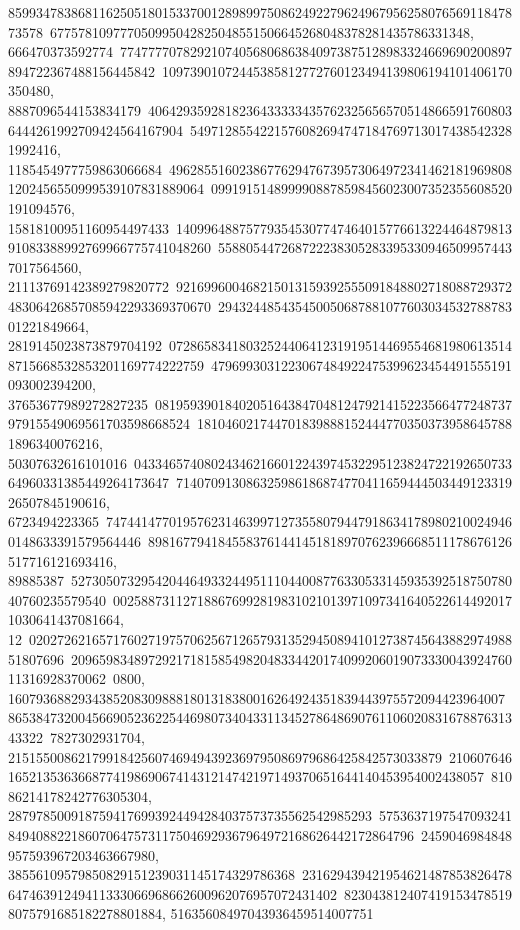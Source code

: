 {{{85993478386811625051801533700128989975086249227962496795625807656911847873578\
677578109777050995042825048551506645268048378281435786331348, 666470373592774\
77477770782921074056806863840973875128983324669690200897894722367488156445842\
10973901072445385812772760123494139806194101406170350480, 8887096544153834179\
40642935928182364333334357623256565705148665917608036444261992709424564167904\
54971285542215760826947471847697130174385423281992416, 1185454977759863066684\
49628551602386776294767395730649723414621819698081202456550999539107831889064\
0991915148999908878598456023007352355608520191094576, 15818100951160954497433\
14099648875779354530774746401577661322446487981391083388992769966775741048260\
5588054472687222383052833953309465099574437017564560, 21113769142389279820772\
92169960046821501315939255509184880271808872937248306426857085942293369370670\
29432448543545005068788107760303453278878301221849664, 2819145023873879704192\
07286583418032524406412319195144695546819806135148715668532853201169774222759\
4796993031223067484922475399623454491555191093002394200, 37653677989272827235\
08195939018402051643847048124792141522356647724873797915549069561703598668524\
1810460217447018398881524447703503739586457881896340076216, 50307632616101016\
04334657408024346216601224397453229512382472219265073364960331385449264173647\
71407091308632598618687477041165944450344912331926507845190616, 6723494223365\
74744147701957623146399712735580794479186341789802100249460148633391579564446\
8981677941845583761441451818970762396668511178676126517716121693416, 89885387\
52730507329542044649332449511104400877633053314593539251875078040760235579540\
0025887311271886769928198310210139710973416405226144920171030641437081664, 12\
02027262165717602719757062567126579313529450894101273874564388297498851807696\
20965983489729217181585498204833442017409920601907333004392476011316928370062\
0800, 16079368829343852083098881801318380016264924351839443975572094423964007\
86538473200456690523622544698073404331134527864869076110602083167887631343322\
7827302931704, 21515500862179918425607469494392369795086979686425842573033879\
21060764616521353636687741986906741431214742197149370651644140453954002438057\
81086214178242776305304, 2879785009187594176993924494284037573735562542985293\
57536371975470932418494088221860706475731175046929367964972168626442172864796\
2459046984848957593967203463667980, 38556109579850829151239031145174329786368\
23162943942195462148785382647864746391249411333066968662600962076957072431402\
8230438124074191534785198075791685182278801884, 51635608497043936459514007751\
}}}

